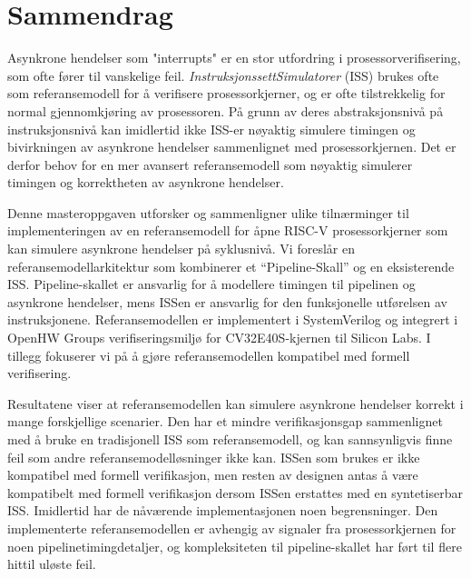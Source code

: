 \chapter*{Sammendrag}

Asynkrone hendelser som "interrupts" er en stor utfordring i prosessorverifisering, som ofte fører til vanskelige feil. \textit{InstruksjonssettSimulatorer} (ISS) brukes ofte som referansemodell for å verifisere prosessorkjerner, og er ofte tilstrekkelig for normal gjennomkjøring av prosessoren. På grunn av deres abstraksjonsnivå på instruksjonsnivå kan imidlertid ikke ISS-er nøyaktig simulere timingen og bivirkningen av asynkrone hendelser sammenlignet med prosessorkjernen. Det er derfor behov for en mer avansert referansemodell som nøyaktig simulerer timingen og korrektheten av asynkrone hendelser. 

Denne masteroppgaven utforsker og sammenligner ulike tilnærminger til  implementeringen av en referansemodell for åpne RISC-V prosessorkjerner som kan simulere asynkrone hendelser på syklusnivå.  Vi foreslår en referansemodellarkitektur som kombinerer et “Pipeline-Skall” og en eksisterende ISS. Pipeline-skallet er ansvarlig for å modellere timingen til pipelinen og asynkrone hendelser, mens ISSen er ansvarlig for den funksjonelle utførelsen av instruksjonene. Referansemodellen er implementert i SystemVerilog og integrert i OpenHW Groups verifiseringsmiljø for CV32E40S-kjernen til Silicon Labs. I tillegg fokuserer vi på å gjøre referansemodellen kompatibel med formell verifisering.

Resultatene viser at referansemodellen kan simulere asynkrone hendelser korrekt i mange forskjellige scenarier. Den har et mindre verifikasjonsgap sammenlignet med å bruke en tradisjonell ISS som referansemodell, og kan sannsynligvis finne feil som andre referansemodelløsninger ikke kan. ISSen som brukes er ikke kompatibel med formell verifikasjon, men resten av designen antas å være kompatibelt med formell verifikasjon dersom ISSen erstattes med en syntetiserbar ISS. Imidlertid har de nåværende implementasjonen noen begrensninger. Den implementerte referansemodellen er avhengig av signaler fra prosessorkjernen for noen pipelinetimingdetaljer, og kompleksiteten til pipeline-skallet har ført til flere hittil uløste feil.



